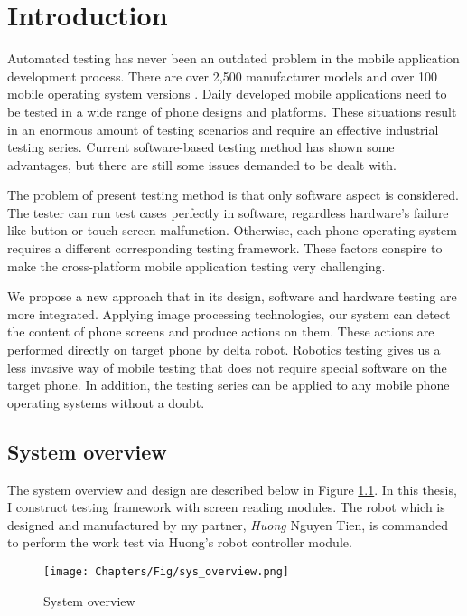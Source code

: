 \chapter{Introduction}

Automated testing has never been an outdated problem in the mobile application development process. There are over 2,500 manufacturer models and over 100 mobile operating system versions \cite{crittercism}. Daily developed mobile applications need to be tested in a wide range of phone designs and platforms. These situations result in an enormous amount of testing scenarios and require an effective industrial testing series. Current software-based testing method has shown some advantages, but there are still some issues demanded to be dealt with.

The problem of present testing method is that only software aspect is considered. The tester can run test cases perfectly in software, regardless hardware's failure like button or touch screen malfunction. Otherwise, each phone operating system requires a different corresponding testing framework. These factors conspire to make the cross-platform mobile application testing very challenging. \nocite{weinman_thesis}

We propose a new approach that in its design, software and hardware testing are more integrated. Applying image processing technologies, our system can detect the content of phone screens and produce actions on them. These actions are performed directly on target phone by delta robot. Robotics testing gives us a less invasive way of mobile testing that does not require special software on the target phone. In addition, the testing series can be applied to any mobile phone operating systems without a doubt.

\section{System overview}
The system overview and design are described below in Figure \ref{fig:sys_overview}.
In this thesis, I construct testing framework with screen reading modules. The robot which is designed and manufactured by my partner, \textit{Huong} Nguyen Tien, is commanded to perform the work test via Huong's robot controller module.

	\begin{figure}
		\centering
		\texttt{[image: Chapters/Fig/sys\_overview.png]}
		\caption{System overview}
		\label{fig:sys_overview}
	\end{figure}

